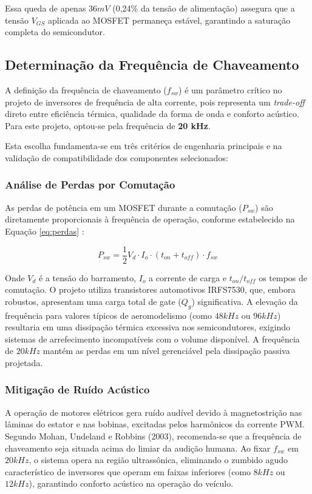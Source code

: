 \documentclass[12pt, a4paper, openright, oneside, brazilian]{abntex2}
\begin{document}
Essa queda de apenas $36mV$ (0,24\% da tensão de alimentação) assegura que a tensão $V_{GS}$ aplicada ao MOSFET permaneça estável, garantindo a saturação completa do semicondutor.

\subsection{Determinação da Frequência de Chaveamento}

A definição da frequência de chaveamento ($f_{sw}$) é um parâmetro crítico no projeto de inversores de frequência de alta corrente, pois representa um \textit{trade-off} direto entre eficiência térmica, qualidade da forma de onda e conforto acústico. Para este projeto, optou-se pela frequência de \textbf{20 kHz}.

Esta escolha fundamenta-se em três critérios de engenharia principais e na validação de compatibilidade dos componentes selecionados:

\subsubsection{Análise de Perdas por Comutação}
As perdas de potência em um MOSFET durante a comutação ($P_{sw}$) são diretamente proporcionais à frequência de operação, conforme estabelecido na Equação \ref{eq:perdas} \cite{rashid2014power}:

\begin{equation} \label{eq:perdas}
P_{sw} = \frac{1}{2} V_{d} \cdot I_{o} \cdot (t_{on} + t_{off}) \cdot f_{sw}
\end{equation}

Onde $V_d$ é a tensão do barramento, $I_o$ a corrente de carga e $t_{on}/t_{off}$ os tempos de comutação.
O projeto utiliza transistores automotivos IRFS7530, que, embora robustos, apresentam uma carga total de gate ($Q_g$) significativa. A elevação da frequência para valores típicos de aeromodelismo (como $48 kHz$ ou $96 kHz$) resultaria em uma dissipação térmica excessiva nos semicondutores, exigindo sistemas de arrefecimento incompatíveis com o volume disponível. A frequência de $20 kHz$ mantém as perdas em um nível gerenciável pela dissipação passiva projetada.

\subsubsection{Mitigação de Ruído Acústico}
A operação de motores elétricos gera ruído audível devido à magnetostrição nas lâminas do estator e nas bobinas, excitadas pelos harmônicos da corrente PWM. Segundo Mohan, Undeland e Robbins (2003), recomenda-se que a frequência de chaveamento seja situada acima do limiar da audição humana.
Ao fixar $f_{sw}$ em $20 kHz$, o sistema opera na região ultrassônica, eliminando o zumbido agudo característico de inversores que operam em faixas inferiores (como $8 kHz$ ou $12 kHz$), garantindo conforto acústico na operação do veículo.
\end{document}
